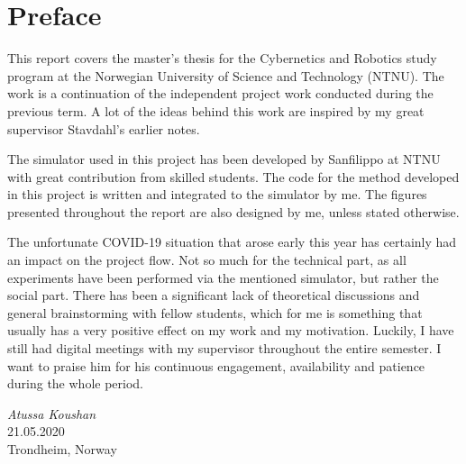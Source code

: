 \chapter{Preface}

This report covers the master's thesis for the Cybernetics and Robotics study program at the Norwegian University of Science and Technology (NTNU). The work is a continuation of the independent project work conducted during the previous term. A lot of the ideas behind this work are inspired by my great supervisor Stavdahl's earlier notes.

The simulator used in this project has been developed by Sanfilippo at NTNU with great contribution from skilled students. The code for the method developed in this project is written and integrated to the simulator by me. The figures presented throughout the report are also designed by me, unless stated otherwise.

The unfortunate COVID-19 situation that arose early this year has certainly had an impact on the project flow. Not so much for the technical part, as all experiments have been performed via the mentioned simulator, but rather the social part. There has been a significant lack of theoretical discussions and general brainstorming with fellow students, which for me is something that usually has a very positive effect on my work and my motivation. Luckily, I have still had digital meetings with my supervisor throughout the entire semester.
I want to praise him for his continuous engagement, availability and patience during the whole period.


\medskip
\begin {flushright}
  \textit{Atussa Koushan} \\
  \textsc {21.05.2020} \\
  Trondheim, Norway
\end {flushright}



\makeatletter
{}


\makeatother




